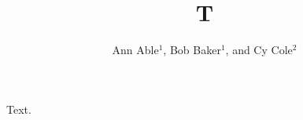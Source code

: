 
\title{T}
\author{Ann Able$^1$, Bob Baker$^1$, and Cy Cole$^2$}
\address{$^1$Univ X, Town,\\ $^2$Univ Y, City}
\maketitle
Text.

